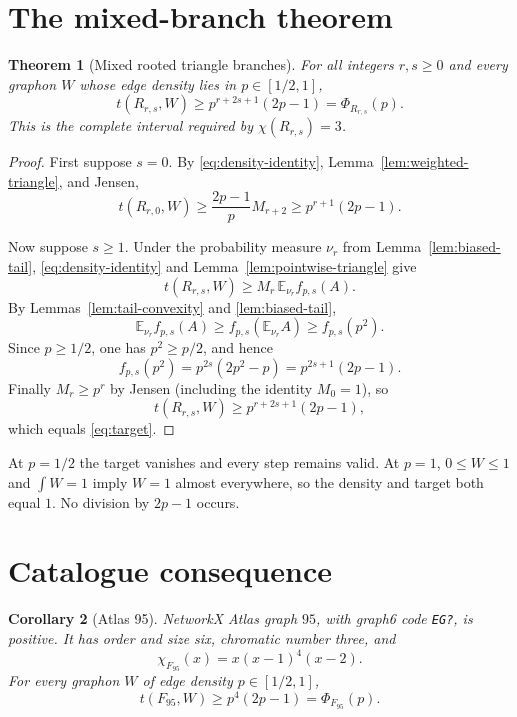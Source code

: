 \documentclass[11pt]{article}
\newtheorem{theorem}{Theorem}[section]
\newtheorem{corollary}[theorem]{Corollary}
\begin{document}
\section{The mixed-branch theorem}

\begin{theorem}[Mixed rooted triangle branches]
\label{thm:main}
For all integers $r,s\geq0$ and every graphon $W$ whose edge density lies in
$p\in[1/2,1]$,
\[
 \boxed{
 t(R_{r,s},W)
 \geq p^{r+2s+1}(2p-1)
 =\Phi_{R_{r,s}}(p).
 }
\]
This is the complete interval required by $\chi(R_{r,s})=3$.
\end{theorem}

\begin{proof}
First suppose $s=0$.  By \eqref{eq:density-identity},
Lemma~\ref{lem:weighted-triangle}, and Jensen,
\[
 t(R_{r,0},W)
 \geq\frac{2p-1}{p}M_{r+2}
 \geq p^{r+1}(2p-1).
\]

Now suppose $s\geq1$.  Under the probability measure $\nu_r$ from
Lemma~\ref{lem:biased-tail}, \eqref{eq:density-identity} and
Lemma~\ref{lem:pointwise-triangle} give
\[
 t(R_{r,s},W)\geq M_r\,\mathbb E_{\nu_r} f_{p,s}(A).
\]
By Lemmas~\ref{lem:tail-convexity} and \ref{lem:biased-tail},
\[
 \mathbb E_{\nu_r} f_{p,s}(A)
 \geq f_{p,s}(\mathbb E_{\nu_r}A)
 \geq f_{p,s}(p^2).
\]
Since $p\geq1/2$, one has $p^2\geq p/2$, and hence
\[
 f_{p,s}(p^2)=p^{2s}(2p^2-p)=p^{2s+1}(2p-1).
\]
Finally $M_r\geq p^r$ by Jensen (including the identity $M_0=1$), so
\[
 t(R_{r,s},W)\geq p^{r+2s+1}(2p-1),
\]
which equals \eqref{eq:target}.
\end{proof}

At $p=1/2$ the target vanishes and every step remains valid.  At $p=1$,
$0\leq W\leq1$ and $\int W=1$ imply $W=1$ almost everywhere, so the density
and target both equal $1$.  No division by $2p-1$ occurs.


\section{Catalogue consequence}

\begin{corollary}[Atlas 95]
NetworkX Atlas graph $95$, with graph6 code \texttt{EG?}, is
positive.  It has order and size six, chromatic number three, and
\[
 \chi_{F_{95}}(x)=x(x-1)^4(x-2).
\]
For every graphon $W$ of edge density $p\in[1/2,1]$,
\[
 t(F_{95},W)\geq p^4(2p-1)=\Phi_{F_{95}}(p).
\]
\end{corollary}
\end{document}
